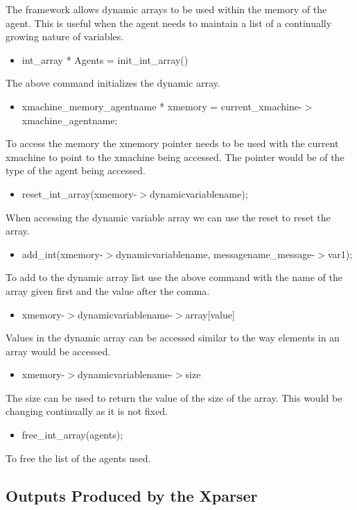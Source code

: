 \documentclass[a4paper,11pt]{article}
\begin{document}
The framework allows dynamic arrays to be used within the memory of
the agent. This is useful when the agent needs to maintain a list of
a continually growing nature of variables.
\begin{itemize}
\item int\_array * Agents = init\_int\_array()
\end{itemize}
The above command initializes the dynamic array.
\begin{itemize}
\item xmachine\_memory\_agentname * xmemory =
current\_xmachine-$>$xmachine\_agentname;
\end{itemize}
To access the memory the xmemory pointer needs to be used with the
current xmachine to point to the xmachine being accessed. The
pointer would be of the type of the agent being accessed.
\begin{itemize}
\item reset\_int\_array(xmemory-$>$dynamicvariablename);
\end{itemize}
When accessing the dynamic variable array we can use the reset to
reset the array.
\begin{itemize}
\item add\_int(xmemory-$>$dynamicvariablename, messagename\_message-$>$var1);
\end{itemize}
To add to the dynamic array list use the above command with the name
of the array given first and the value after the comma.
\begin{itemize}
\item xmemory-$>$dynamicvariablename-$>$array[value]
\end{itemize}
Values in the dynamic array can be accessed similar to the way
elements in an array would be accessed.
\begin{itemize}
\item xmemory-$>$dynamicvariablename-$>$size
\end{itemize}
The size can be used to return the value of the size of the array.
This would be changing continually as it is not fixed.
\begin{itemize}
\item free\_int\_array(agents);
\end{itemize}
To free the list of the agents used.

\subsection{Outputs Produced by the Xparser}
\end{document}
